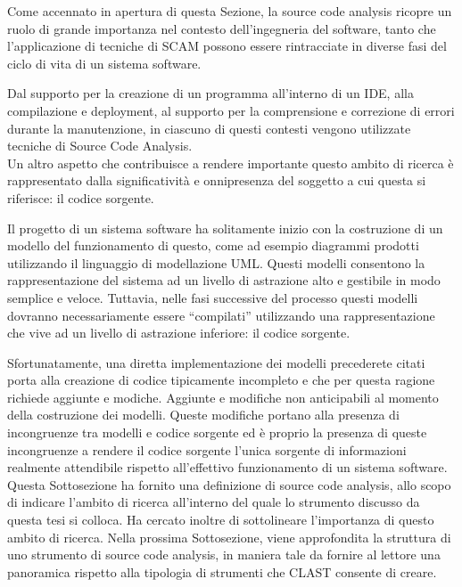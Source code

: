 Come accennato in apertura di questa Sezione, la source code analysis ricopre un
ruolo di grande importanza nel contesto dell'ingegneria del software, tanto che
l'applicazione di tecniche di SCAM possono essere rintracciate in diverse fasi
del ciclo di vita di un sistema software.

Dal supporto per la creazione di un programma all’interno di un IDE, alla
compilazione e deployment, al supporto per la comprensione e correzione di
errori durante la manutenzione, in ciascuno di questi contesti vengono
utilizzate tecniche di Source Code Analysis.\\

Un altro aspetto che contribuisce a rendere importante questo ambito di ricerca
è rappresentato dalla significatività e onnipresenza del soggetto a cui questa
si riferisce: il codice sorgente.

Il progetto di un sistema software ha solitamente inizio con la costruzione di
un modello del funzionamento di questo, come ad esempio diagrammi prodotti
utilizzando il linguaggio di modellazione UML. Questi modelli consentono la
rappresentazione del sistema ad un livello di astrazione alto e gestibile in
modo semplice e veloce. Tuttavia, nelle fasi successive del processo questi
modelli dovranno necessariamente essere “compilati” utilizzando una
rappresentazione che vive ad un livello di astrazione inferiore: il codice
sorgente.

Sfortunatamente, una diretta implementazione dei modelli precederete citati
porta alla creazione di codice tipicamente incompleto e che per questa ragione
richiede aggiunte e modiche. Aggiunte e modifiche non anticipabili al momento
della costruzione dei modelli. Queste modifiche portano alla presenza di
incongruenze tra modelli e codice sorgente ed è proprio la presenza di queste
incongruenze a rendere il codice sorgente l’unica sorgente di informazioni
realmente attendibile rispetto all’effettivo funzionamento di un sistema
software.\\

Questa Sottosezione ha fornito una definizione di source code analysis, allo
scopo di indicare l'ambito di ricerca all'interno del quale lo strumento
discusso da questa tesi si colloca. Ha cercato inoltre di sottolineare
l'importanza di questo ambito di ricerca. Nella prossima Sottosezione, viene
approfondita la struttura di uno strumento di source code analysis, in maniera
tale da fornire al lettore una panoramica rispetto alla tipologia di strumenti
che CLAST consente di creare.

